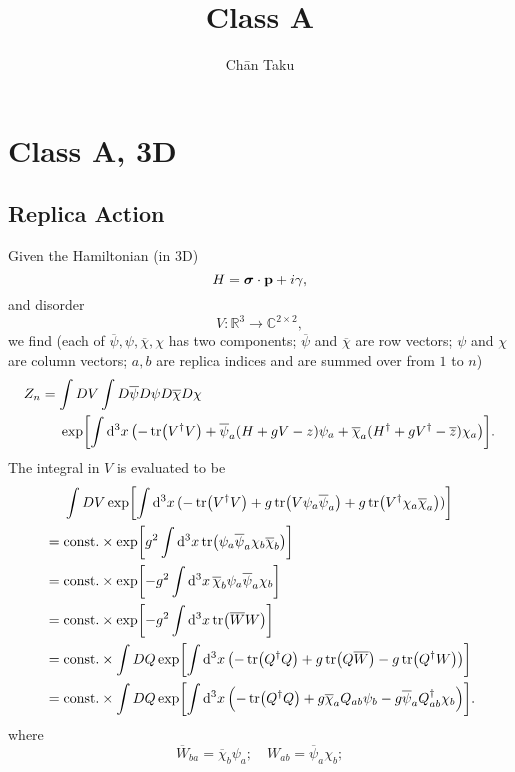 \documentclass[letterpaper]{article}
\title{Class A}
\author{Ch\=an Taku}
\begin{document}

\section*{Class A, 3D}

\subsection*{Replica Action}

Given the Hamiltonian (in 3D)
\[ H = \vb*{\sigma} \cdot \vb{p} + i \gamma, \]
and disorder
\[ V: \mathbb{R}^3 \rightarrow \mathbb{C}^{2\times 2}, \]
we find (each of $\overline{\psi},\psi,\overline{\chi},\chi$ has two components; $\overline{\psi}$ and $\overline{\chi}$ are row vectors; $\psi$ and $\chi$ are column vectors; $a,b$ are replica indices and are summed over from $1$ to $n$)
\begin{align*}
    Z_n &= \int DV \int D{\overline{\psi}}D{{\psi}}D{\overline{\chi}}D{{\chi}} \\
    &\phantom{{}={}} \exp[\int \dd[3]{x}\qty(-\tr(V^\dagger V) + \overline{\psi}_a(H + gV - z)\psi_a + \overline{\chi}_a(H^\dagger + gV^\dagger - \overline{z})\chi_a)].
\end{align*}
The integral in $V$ is evaluated to be
\begin{align*}
    &\phantom{{}={}} \int DV \exp[\int \dd[3]{x} (-\tr(V^\dagger V) + g\tr(V \psi_a \overline{\psi}_a) + g\tr(V^\dagger \chi_a \overline{\chi}_a))] \\
    &= \text{const.} \times \exp[g^2 \int \dd[3]{x} \tr(\psi_a \overline{\psi}_a \chi_b \overline{\chi}_b)] \\
    &= \text{const.} \times \exp[-g^2 \int \dd[3]{x} \overline{\chi}_b \psi_a \overline{\psi}_a \chi_b ] \\
    &= \text{const.} \times \exp[-g^2 \int \dd[3]{x} \tr(\overline{W}W) ] \\
    &= \text{const.} \times \int DQ \exp[\int \dd[3]{x} \qty(-\tr(Q^\dagger Q) + g \tr(Q\overline{W}) - g\tr(Q^\dagger W)) ] \\
    &= \text{const.} \times \int DQ \exp[\int \dd[3]{x} \qty(-\tr(Q^\dagger Q) + g \overline{\chi}_a Q_{ab} \psi_b - g\overline{\psi}_a Q^\dagger_{ab}\chi_b) ].
\end{align*}
where
\[ \overline{W}_{ba} = \overline{\chi}_b \psi_a;\quad W_{ab} = \overline{\psi}_a \chi_b; \]
\end{document}
